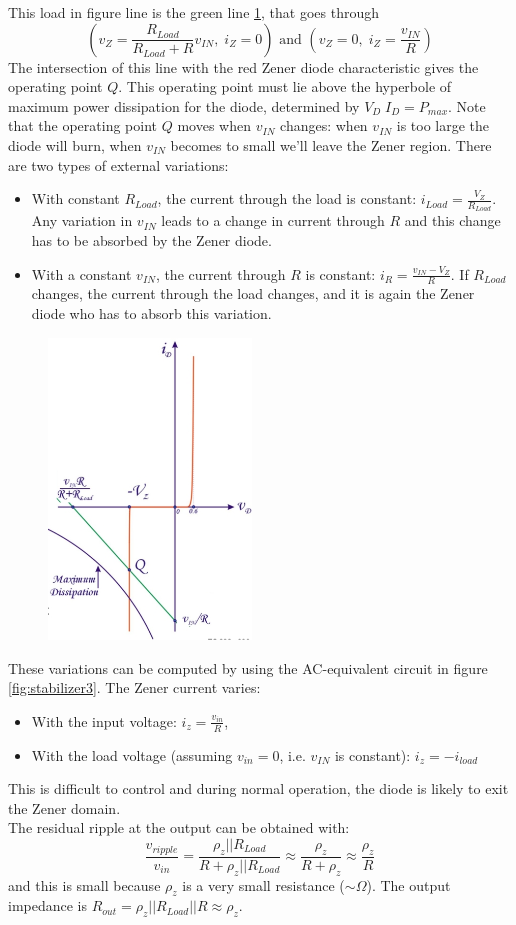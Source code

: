 This load in figure  line is the green line \ref{fig:stabilizer2}, that goes through
$$(v_Z =  \frac{R_{Load}}{R_{Load} + R} v_{IN},\; i_Z = 0)  \text{ and } (v_Z = 0,\; i_Z = \frac{v_{IN}}{R})$$
The intersection of this line with the red Zener diode characteristic gives the operating point $Q$. This operating point must lie above the hyperbole of maximum power dissipation for the diode, determined by $V_D \; I_D  = P_{max}$. Note that the operating point $Q$ moves when $v_{IN}$ changes: when $v_{IN}$ is too large the diode will burn, when $v_{IN}$ becomes to small we'll leave the Zener region.
There are two types of external variations:
\begin{itemize}
	\item With constant $R_{Load}$, the current through the load is constant: $i_{Load} = \frac{V_Z}{R_{Load}}$. Any variation in $v_{IN}$ leads to a change in current through $R$ and this change has to be absorbed by the Zener diode.
	\item With a constant $v_{IN}$, the current through $R$ is constant: $i_R = \frac{v_{IN} - V_Z}{R}$. If $R_{Load}$ changes, the current through the load changes, and it is again the Zener diode who has to absorb this variation.
\end{itemize}

\begin{figure}[h!]
	\centering
	\includegraphics[height=8cm]{figures/ch12/stabilizer2.jpg}
	\caption{}
	\label{fig:stabilizer2}
\end{figure}
These variations can be computed by using the AC-equivalent circuit in figure \ref{fig:stabilizer3}. The Zener current varies:
\begin{itemize}
	\item With the input voltage: $i_z = \frac{v_{in}}{R}$,
	\item With the load voltage (assuming $v_{in} = 0$, i.e. $v_{IN}$ is constant): $i_z = -i_{load}$
\end{itemize}
This is difficult to control and during normal operation, the diode is likely to exit the Zener domain.\\
The residual ripple at the output can be obtained with:
$$\frac{v_{ripple}}{v_{in}} = \frac{\rho_z || R_{Load}}{R + \rho_z || R_{Load}} \approx \frac{\rho_z}{R + \rho_z}  \approx \frac{\rho_z}{R}$$
and this is small because $\rho_z$ is a very small resistance ($\sim \Omega$).
The output impedance is $R_{out} = \rho_z || R_{Load} || R \approx  \rho_z$.

